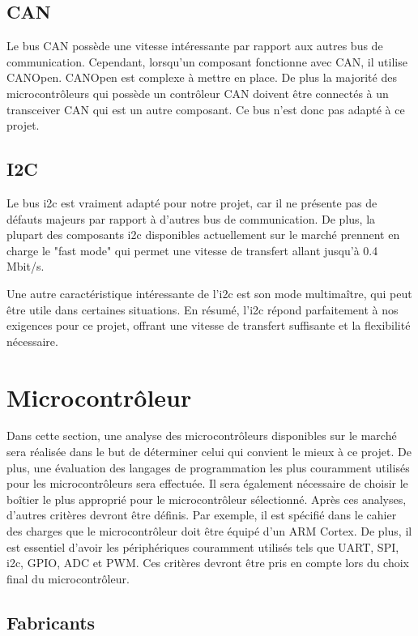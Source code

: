 \subsection{CAN}

Le bus CAN possède une vitesse intéressante par rapport aux autres bus de communication.
Cependant, lorsqu'un composant fonctionne avec CAN, il utilise CANOpen. CANOpen est complexe à mettre en place.
De plus la majorité des microcontrôleurs qui possède un contrôleur CAN doivent être connectés à un transceiver CAN qui est un autre composant.
Ce bus n'est donc pas adapté à ce projet.

\subsection{I2C}

Le bus \gls{i2c} est vraiment adapté pour notre projet, car il ne présente pas de défauts majeurs par rapport à d'autres bus de communication.
De plus, la plupart des composants \gls{i2c} disponibles actuellement sur le marché prennent en charge le "fast mode" qui permet une vitesse de transfert allant jusqu'à 0.4 Mbit/s.

Une autre caractéristique intéressante de l'\gls{i2c} est son mode multimaître, qui peut être utile dans certaines situations.
En résumé, l'\gls{i2c} répond parfaitement à nos exigences pour ce projet, offrant une vitesse de transfert suffisante et la flexibilité nécessaire.

\section{Microcontrôleur}

Dans cette section, une analyse des microcontrôleurs disponibles sur le marché sera réalisée dans le but de déterminer celui qui convient le mieux à ce projet.
De plus, une évaluation des langages de programmation les plus couramment utilisés pour les microcontrôleurs sera effectuée.
Il sera également nécessaire de choisir le boîtier le plus approprié pour le microcontrôleur sélectionné.
Après ces analyses, d'autres critères devront être définis.
Par exemple, il est spécifié dans le cahier des charges que le microcontrôleur doit être équipé d'un ARM Cortex.
De plus, il est essentiel d'avoir les périphériques couramment utilisés tels que UART, SPI, \gls{i2c}, GPIO, ADC et PWM.
Ces critères devront être pris en compte lors du choix final du microcontrôleur.

\subsection{Fabricants}

